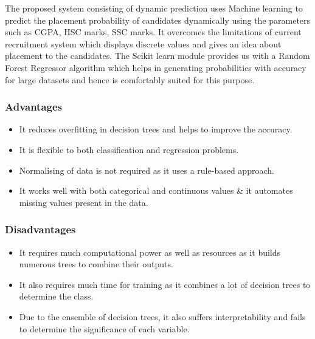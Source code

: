 \documentclass[12pt]{article}
\begin{document}
The proposed system consisting of dynamic 
prediction uses Machine learning to predict the 
placement probability of candidates dynamically 
using the parameters such as CGPA, HSC marks, 
SSC marks. It overcomes the limitations of current 
recruitment system which displays discrete values 
and gives an idea about placement to the candidates. 
The Scikit learn module provides us with a Random 
Forest Regressor algorithm which helps in 
generating probabilities with accuracy for large 
datasets and hence is comfortably suited for this 
purpose.

\newpage

\subsubsection{Advantages}
\begin{itemize}
\item It reduces overfitting in decision trees and helps to improve the accuracy.
\item It is flexible to both classification and regression problems.
\item Normalising of data is not required as it uses a rule-based approach.
\item It works well with both categorical and continuous values \& it automates missing values present in the data.
\end{itemize}
\vspace{10px}
\subsubsection{Disadvantages}
\begin{itemize}
\item It requires much computational power as well as resources as it builds numerous trees to combine their outputs.
\item It also requires much time for training as it combines a lot of decision trees to determine the class.
\item Due to the ensemble of decision trees, it also suffers interpretability and fails to determine the significance of each variable.
\end{itemize}
\vspace{10px}

\newpage
\end{document}
